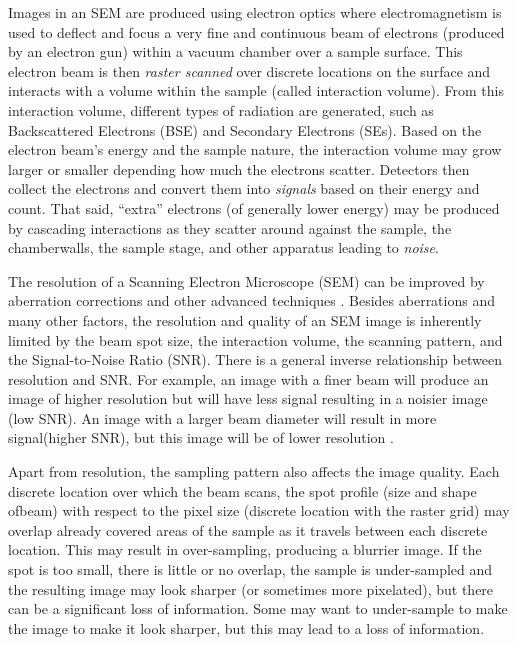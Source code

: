 \documentclass{article}
\begin{document}
Images in an SEM are produced using electron optics where electromagnetism is
used to deflect and focus a very fine and continuous beam of electrons
(produced by an electron gun) within a vacuum chamber over a sample surface. This
electron beam is then {\it raster scanned} over discrete locations on the surface
and interacts with a volume within the sample (called interaction
volume)\cite{goldstein_image_2018}. From this interaction volume, different
types of radiation are generated, such as Backscattered Electrons (BSE) and
Secondary Electrons (SEs). Based on the electron beam’s energy and the sample
nature, the interaction volume may grow larger or smaller depending how much the
electrons scatter. Detectors then collect the electrons and convert them into
{\it signals} based on their energy and count. That said, “extra” electrons (of
generally lower energy) may be produced by cascading interactions as they
scatter around against the sample, the chamberwalls, the sample stage, and other
apparatus leading to {\it noise}.

The resolution of a Scanning Electron Microscope (SEM) can be improved by
aberration corrections and other advanced techniques \cite{joy_dc_2005}.
Besides aberrations and many other factors, the resolution and quality of an SEM
image is inherently limited by the beam spot size, the interaction volume, the 
scanning pattern, and the Signal-to-Noise Ratio (SNR). There is a general inverse
relationship between resolution and SNR. For example, an image with a finer beam
will produce an image of higher resolution but will have less signal resulting in a noisier
image (low SNR). An image with a larger beam diameter will result in more
signal(higher SNR), but this image will be of lower resolution
\cite{jeol_scanning_2013}.

Apart from resolution, the sampling pattern also affects the image quality.
Each discrete location over which the beam scans, the spot profile (size and
shape ofbeam) with respect to the pixel size (discrete location with the raster
grid) may overlap already covered areas of the sample as it travels between each
discrete location. This may result in over-sampling, producing a blurrier
image. If the spot is too small, there is little or no overlap, the sample is
under-sampled and the resulting image may look sharper (or sometimes more
pixelated), but there can be a significant loss of information. Some may want
to under-sample to make the image to make it look sharper, but this may lead to a
loss of information.
\end{document}
